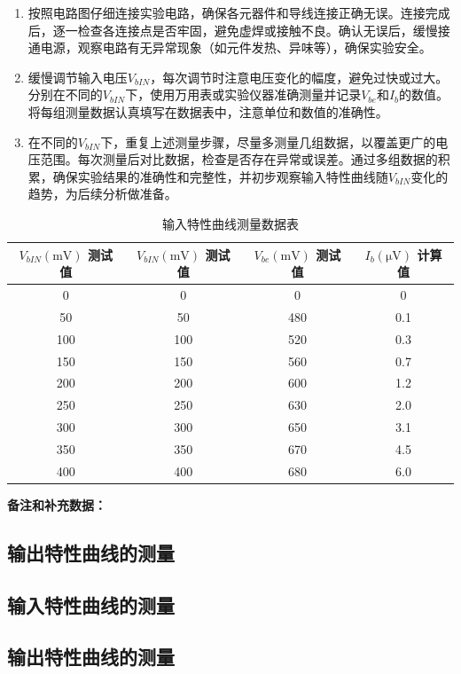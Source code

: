 \documentclass[12pt,a4paper,UTF8]{ctexart}
\begin{document}
\begin{enumerate}[label=(\arabic*)]
    \item 按照电路图仔细连接实验电路，确保各元器件和导线连接正确无误。连接完成后，逐一检查各连接点是否牢固，避免虚焊或接触不良。确认无误后，缓慢接通电源，观察电路有无异常现象（如元件发热、异味等），确保实验安全。

    \item 缓慢调节输入电压$V_{bIN}$，每次调节时注意电压变化的幅度，避免过快或过大。分别在不同的$V_{bIN}$下，使用万用表或实验仪器准确测量并记录$V_{be}$和$I_{b}$的数值。将每组测量数据认真填写在数据表中，注意单位和数值的准确性。

    \item 在不同的$V_{bIN}$下，重复上述测量步骤，尽量多测量几组数据，以覆盖更广的电压范围。每次测量后对比数据，检查是否存在异常或误差。通过多组数据的积累，确保实验结果的准确性和完整性，并初步观察输入特性曲线随$V_{bIN}$变化的趋势，为后续分析做准备。
\end{enumerate}

\begin{table}[h]
    \centering

    \begin{tabular}{|c|c|c|c|}
        \hline
        $V_{bIN} \left(\mathrm{mV}\right) $ 测试值 & $V_{bIN} \left(\mathrm{mV}\right) $ 测试值 & $V_{be} \left(\mathrm{mV}\right) $ 测试值 & $I_{b} \left(\mathrm{\mu V}\right)$ 计算值 \\ \hline
        0   & 0    & 0    & 0    \\ \hline
        50  & 50   & 480  & 0.1  \\ \hline
        100 & 100  & 520  & 0.3  \\ \hline
        150 & 150  & 560  & 0.7  \\ \hline
        200 & 200  & 600  & 1.2  \\ \hline
        250 & 250  & 630  & 2.0  \\ \hline
        300 & 300  & 650  & 3.1  \\ \hline
        350 & 350  & 670  & 4.5  \\ \hline
        400 & 400  & 680  & 6.0  \\ \hline
    \end{tabular}
    \caption{输入特性曲线测量数据表}
    \label{tab:input_characteristics}
\end{table}

\textbf{备注和补充数据：}
\lipsum[1]

\subsection{输出特性曲线的测量}
\lipsum[2]

\renewcommand\thesubsection{2.\arabic{subsection}}
\setcounter{subsection}{0}
\subsection{输入特性曲线的测量}
\lipsum[3]

\subsection{输出特性曲线的测量}

\lipsum[4]

\end{document}
